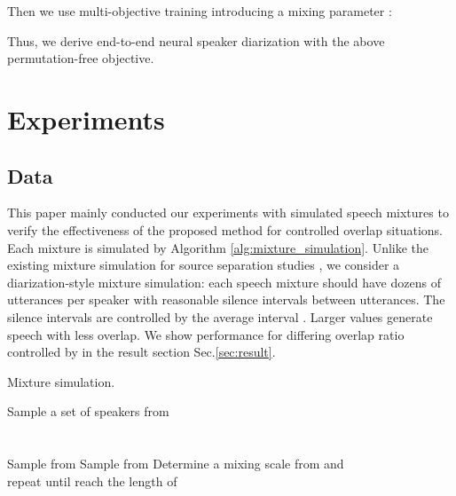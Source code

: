 \documentclass[a4paper]{article}
\begin{document}
Then we use multi-objective training introducing a mixing parameter :

Thus, we derive end-to-end neural speaker diarization with the above permutation-free objective.

\section{Experiments}

\subsection{Data}
\label{sec:data}

This paper mainly conducted our experiments with simulated speech mixtures to verify the effectiveness of the proposed method for controlled overlap situations.
Each mixture is simulated by Algorithm \ref{alg:mixture_simulation}.
Unlike the existing mixture simulation for source separation studies \cite{Hershey2016}, we consider a diarization-style mixture simulation: each speech mixture should have dozens of utterances per speaker with reasonable silence intervals between utterances.
The silence intervals are controlled by the average interval . Larger  values generate speech with less overlap. 
We show performance for differing overlap ratio controlled by  in the result section Sec.\ref{sec:result}.

\begin{algorithm}[t]
	\SetAlgoLined
	\DontPrintSemicolon
	\caption{Mixture simulation.}
	\label{alg:mixture_simulation}
	\SetAlgoVlined
	\BlankLine
	Sample a set of  speakers  from \\
		\\
		\\
		Sample  from 
		Sample  from 
		Determine a mixing scale  from  and \\
		 repeat  until reach the length of \\
		\\
\end{algorithm}
\end{document}
